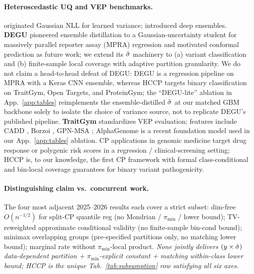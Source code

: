 \paragraph{Heteroscedastic UQ and VEP benchmarks.}
\citet{nix1994nll} originated Gaussian NLL for learned variance; \citet{lakshminarayanan2017simple} introduced deep ensembles. \textbf{DEGU} \citep{zhou2026degu} pioneered ensemble distillation to a Gaussian-uncertainty student for massively parallel reporter assay (MPRA) regression and motivated conformal prediction as future work; we extend its $\hat{\sigma}$ machinery to (a) variant classification and (b) finite-sample local coverage with adaptive partition granularity. We do not claim a head-to-head defeat of DEGU: DEGU is a regression pipeline on MPRA with a Keras CNN ensemble, whereas HCCP targets binary classification on TraitGym, Open Targets, and ProteinGym; the ``DEGU-lite'' ablation in App.~\ref{app:tables} reimplements the ensemble-distilled $\hat{\sigma}$ at our matched GBM backbone solely to isolate the choice of variance source, not to replicate DEGU's published pipeline. \textbf{TraitGym} \citep{benegas2025traitgym} standardizes VEP evaluation; features include CADD \citep{kircher2014cadd}, Borzoi \citep{linder2025borzoi}, GPN-MSA \citep{benegas2023gpnmsa}; AlphaGenome \citep{avsec2026alphagenome} is a recent foundation model used in our App.~\ref{app:tables} ablation. CP applications in genomic medicine \citep{papangelou2025cpgenomics,wang2025cqrprs,pcos2025conformal} target drug response or polygenic risk scores in a regression / clinical-screening setting; HCCP is, to our knowledge, the first CP framework with formal class-conditional and bin-local coverage guarantees for binary variant pathogenicity.

\paragraph{Distinguishing claim vs.\ concurrent work.}
The four most adjacent 2025--2026 results each cover a strict subset: \citet{yao2026nonasymp} dim-free $O(n^{-1/2})$ for split-CP quantile reg (no Mondrian / $\pi_{\min}$ / lower bound); \citet{plassier2025cp2hpd} TV-reweighted approximate conditional validity (no finite-sample bin-cond bound); \citet{bairaktari2025kandinsky} minimax overlapping groups (pre-specified partitions only, no matching lower bound); \citet{xie2025imbalancedcp} marginal rate without $\pi_{\min}$-local product. \emph{None jointly delivers $(y \times \hat{\sigma})$ data-dependent partition + $\pi_{\min}$-explicit constant + matching within-class lower bound; HCCP is the unique Tab.~\ref{tab:subsumption} row satisfying all six axes.}
